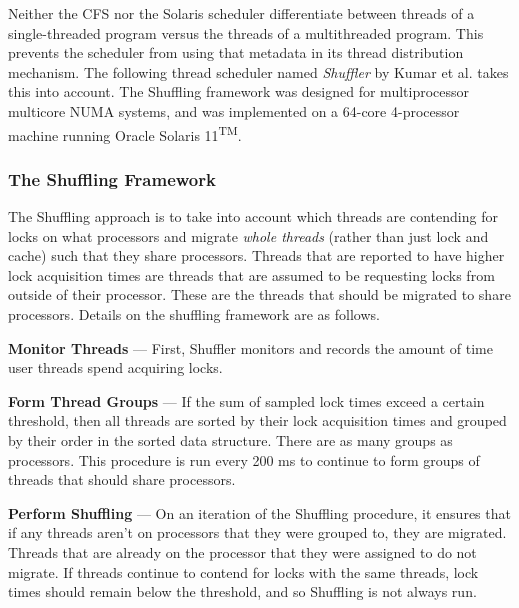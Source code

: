 \documentclass{sig-alternate}
\begin{document}
Neither the CFS nor the Solaris scheduler differentiate between threads of a single-threaded program versus the threads of a multithreaded program. This prevents the scheduler from using that metadata in its thread distribution mechanism. The following thread scheduler named \emph{Shuffler} by Kumar et al. takes this into account. The Shuffling framework was designed for multiprocessor multicore NUMA systems, and was implemented on a 64-core 4-processor machine running Oracle Solaris 11\textsuperscript{TM}.~\cite{Kumar:2014}

\subsubsection{The Shuffling Framework}

The Shuffling approach is to take into account which threads are contending for locks on what processors and migrate \textit{whole threads} (rather than just lock and cache) such that they share processors. Threads that are reported to have higher lock acquisition times are threads that are assumed to be requesting locks from outside of their processor. These are the threads that should be migrated to share processors. Details on the shuffling framework are as follows.

\textbf{Monitor Threads} --- First, Shuffler monitors and records the amount of time user threads spend acquiring locks.

\vspace{1 mm}

\textbf{Form Thread Groups} --- If the sum of sampled lock times exceed a certain threshold, then all threads are sorted by their lock acquisition times and grouped by their order in the sorted data structure. There are as many groups as processors. This procedure is run every 200 ms to continue to form groups of threads that should share processors.

\vspace{1 mm}

\textbf{Perform Shuffling} --- On an iteration of the Shuffling procedure, it ensures that if any threads aren't on processors that they were grouped to, they are migrated. Threads that are already on the processor that they were assigned to do not migrate. If threads continue to contend for locks with the same threads, lock times should remain below the threshold, and so Shuffling is not always run.~\cite{Kumar:2014}

\vspace{1 mm}
\end{document}
